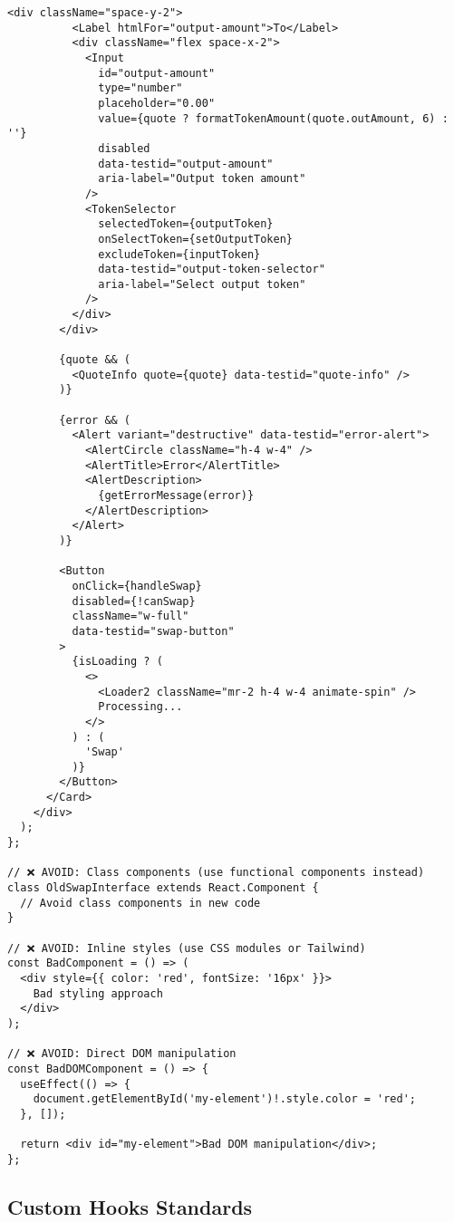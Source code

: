 \documentclass[11pt,a4paper]{article}
\begin{document}
\begin{lstlisting}[style=typescript, caption=React Component Standards]
        <div className="space-y-2">
          <Label htmlFor="output-amount">To</Label>
          <div className="flex space-x-2">
            <Input
              id="output-amount"
              type="number"
              placeholder="0.00"
              value={quote ? formatTokenAmount(quote.outAmount, 6) : ''}
              disabled
              data-testid="output-amount"
              aria-label="Output token amount"
            />
            <TokenSelector
              selectedToken={outputToken}
              onSelectToken={setOutputToken}
              excludeToken={inputToken}
              data-testid="output-token-selector"
              aria-label="Select output token"
            />
          </div>
        </div>

        {quote && (
          <QuoteInfo quote={quote} data-testid="quote-info" />
        )}

        {error && (
          <Alert variant="destructive" data-testid="error-alert">
            <AlertCircle className="h-4 w-4" />
            <AlertTitle>Error</AlertTitle>
            <AlertDescription>
              {getErrorMessage(error)}
            </AlertDescription>
          </Alert>
        )}

        <Button
          onClick={handleSwap}
          disabled={!canSwap}
          className="w-full"
          data-testid="swap-button"
        >
          {isLoading ? (
            <>
              <Loader2 className="mr-2 h-4 w-4 animate-spin" />
              Processing...
            </>
          ) : (
            'Swap'
          )}
        </Button>
      </Card>
    </div>
  );
};

// ❌ AVOID: Class components (use functional components instead)
class OldSwapInterface extends React.Component {
  // Avoid class components in new code
}

// ❌ AVOID: Inline styles (use CSS modules or Tailwind)
const BadComponent = () => (
  <div style={{ color: 'red', fontSize: '16px' }}>
    Bad styling approach
  </div>
);

// ❌ AVOID: Direct DOM manipulation
const BadDOMComponent = () => {
  useEffect(() => {
    document.getElementById('my-element')!.style.color = 'red';
  }, []);
  
  return <div id="my-element">Bad DOM manipulation</div>;
};
\end{lstlisting}

\subsection{Custom Hooks Standards}
\end{document}
